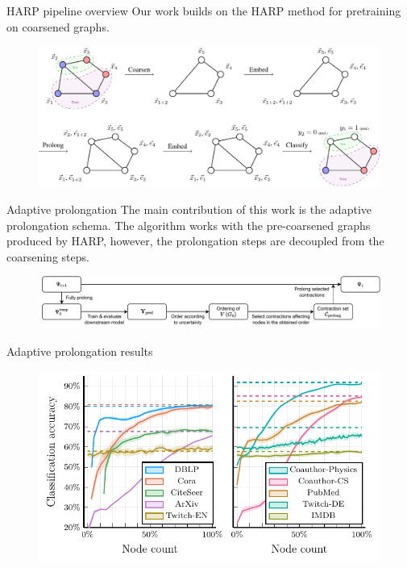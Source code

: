 \documentclass{beamer}
\newlength{\colwidth}
\begin{document}
\begin{frame}[fragile,t]
\begin{columns}[t]
\begin{column}{\colwidth}
		\begin{block}{HARP pipeline overview}
			Our work builds on the HARP method for pretraining on coarsened graphs.
			\begin{figure}
				\includegraphics[width=0.85\linewidth]{images/harp-overview/harp-overview.pdf}
			\end{figure}
		\end{block}

		\begin{block}{Adaptive prolongation}
			The main contribution of this work is the adaptive prolongation schema. The algorithm works with the pre-coarsened graphs produced by HARP, however, the prolongation steps are decoupled from the coarsening steps.
			\begin{figure}
				\includegraphics[width=\linewidth]{images/adaptive-prolongation/adaptive-prolongation.pdf}
			\end{figure}
		\end{block}

		\begin{block}{Adaptive prolongation results}
			\begin{figure}
				\includegraphics[width=0.7\linewidth]{images/adaptive-coarsening/adaptive-coarsening.pdf}
			\end{figure}
		\end{block}
	\end{column}


\end{columns}
\end{frame}
\end{document}
